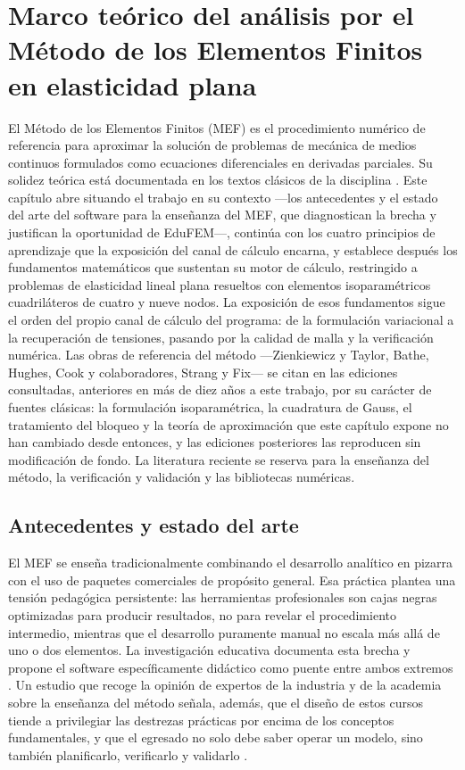 \chapter{Marco teórico del análisis por el Método de los Elementos Finitos en elasticidad plana}
\label{cap:marco_teorico}

El Método de los Elementos Finitos (MEF) es el procedimiento numérico de referencia para aproximar la solución de problemas de mecánica de medios continuos formulados como ecuaciones diferenciales en derivadas parciales. Su solidez teórica está documentada en los textos clásicos de la disciplina \autocite{zienkiewicz2013fem,bathe2014fem,cook2002concepts}. Este capítulo abre situando el trabajo en su contexto —los antecedentes y el estado del arte del software para la enseñanza del MEF, que diagnostican la brecha y justifican la oportunidad de EduFEM—, continúa con los cuatro principios de aprendizaje que la exposición del canal de cálculo encarna, y establece después los fundamentos matemáticos que sustentan su motor de cálculo, restringido a problemas de elasticidad lineal plana resueltos con elementos isoparamétricos cuadriláteros de cuatro y nueve nodos. La exposición de esos fundamentos sigue el orden del propio canal de cálculo del programa: de la formulación variacional a la recuperación de tensiones, pasando por la calidad de malla y la verificación numérica. Las obras de referencia del método —Zienkiewicz y Taylor, Bathe, Hughes, Cook y colaboradores, Strang y Fix— se citan en las ediciones consultadas, anteriores en más de diez años a este trabajo, por su carácter de fuentes clásicas: la formulación isoparamétrica, la cuadratura de Gauss, el tratamiento del bloqueo y la teoría de aproximación que este capítulo expone no han cambiado desde entonces, y las ediciones posteriores las reproducen sin modificación de fondo. La literatura reciente se reserva para la enseñanza del método, la verificación y validación y las bibliotecas numéricas.

\section{Antecedentes y estado del arte}
\label{sec:antecedentes}

El MEF se enseña tradicionalmente combinando el desarrollo analítico en pizarra con el uso de paquetes comerciales de propósito general. Esa práctica plantea una tensión pedagógica persistente: las herramientas profesionales son cajas negras optimizadas para producir resultados, no para revelar el procedimiento intermedio, mientras que el desarrollo puramente manual no escala más allá de uno o dos elementos. La investigación educativa documenta esta brecha y propone el software específicamente didáctico como puente entre ambos extremos \autocite{bishay2020teaching,lee2015interactive,perezsantiago2023fem}. Un estudio que recoge la opinión de expertos de la industria y de la academia sobre la enseñanza del método señala, además, que el diseño de estos cursos tiende a privilegiar las destrezas prácticas por encima de los conceptos fundamentales, y que el egresado no solo debe saber operar un modelo, sino también planificarlo, verificarlo y validarlo \autocite[p.~1159]{perezsantiago2023fem}.

